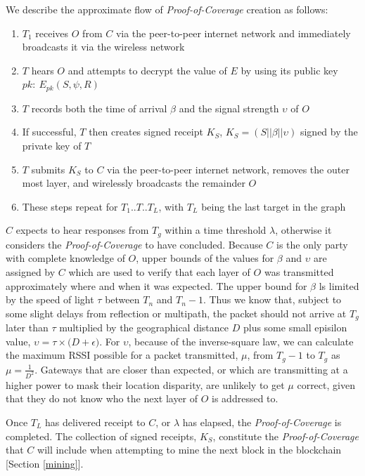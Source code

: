 \documentclass[10pt, nonatbib, nocopyrightspace, reprint]{sigplanconf}
\begin{document}
We describe the approximate flow of \emph{Proof-of-Coverage} creation as follows:

\begin{enumerate}
  \item $T_1$ receives $O$ from $C$ via the peer-to-peer internet network and immediately broadcasts it via the wireless network
  \item $T$ hears $O$ and attempts to decrypt the value of $E$ by using its public key $pk:\ E_{pk}\left(S, \psi, R\right)$
  \item $T$ records both the time of arrival $\beta$ and the signal strength $\upsilon$ of $O$
  \item If successful, $T$ then creates signed receipt $K_S$, ${K_S = \left(S || \beta || \upsilon\right)}$ signed by the private key of $T$
  \item $T$ submits $K_S$ to $C$ via the peer-to-peer internet network, removes the outer most layer, and wirelessly broadcasts the remainder $O$
  \item These steps repeat for $T_1$..$T$..$T_L$, with $T_L$ being the last target in the graph
\end{enumerate}

$C$ expects to hear responses from $T_g$ within a time threshold $\lambda$, otherwise it considers the \emph{Proof-of-Coverage} to have concluded. Because $C$ is the only party with complete knowledge of $O$, upper bounds of the values for $\beta$ and $\upsilon$ are assigned by $C$ which are used to verify that each layer of $O$ was transmitted approximately where and when it was expected. The upper bound for $\beta$ ls limited by the speed of light $\tau$ between $T_n$ and $T_n-1$. Thus we know that, subject to some slight delays from reflection or multipath, the packet should not arrive at $T_g$ later than $\tau$ multiplied by the geographical distance $D$ plus some small episilon value, $\upsilon = \tau \times \Big(D + \epsilon\Big)$. For $\upsilon$, because of the inverse-square law, we can calculate the maximum RSSI possible for a packet transmitted, $\mu$, from $T_g-1$ to $T_g$ as $\mu = \frac{1}{D^2}$. Gateways that are closer than expected, or which are transmitting at a higher power to mask their location disparity, are unlikely to get $\mu$ correct, given that they do not know who the next layer of $O$ is addressed to.

Once $T_L$ has delivered receipt to $C$, or $\lambda$ has elapsed, the \emph{Proof-of-Coverage} is completed. The collection of signed receipts, $K_S$, constitute the \emph{Proof-of-Coverage} that $C$ will include when attempting to mine the next block in the blockchain [Section \ref{mining}].
\end{document}
